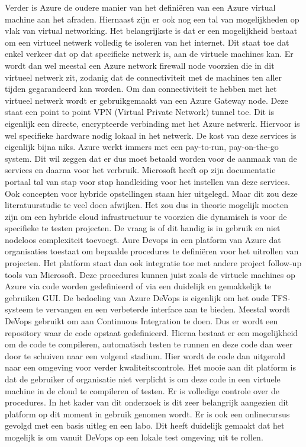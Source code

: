 Verder is Azure de oudere manier van het definiëren van een Azure virtual machine aan het afraden. Hiernaast zijn er ook nog een tal van mogelijkheden op vlak van virtual networking. Het belangrijkste is dat er een mogelijkheid bestaat om een virtueel netwerk volledig te isoleren van het internet. Dit staat toe dat enkel verkeer dat op dat specifieke netwerk is, aan de virtuele machines kan. Er wordt dan wel meestal een Azure network firewall node voorzien die in dit virtueel netwerk zit, zodanig dat de connectiviteit met de machines ten aller tijden gegarandeerd kan worden. Om dan connectiviteit te hebben met het virtueel netwerk wordt er gebruikgemaakt van een Azure Gateway node. Deze staat een point to point VPN (Virtual Private Network) tunnel toe. Dit is eigenlijk een directe, encrypteerde verbinding met het Azure netwerk. Hiervoor is wel specifieke hardware nodig lokaal in het netwerk. De kost van deze services is eigenlijk bijna niks. Azure werkt immers met een pay-to-run, pay-on-the-go system. Dit wil zeggen dat er dus moet betaald worden voor de aanmaak van de services en daarna voor het verbruik. Microsoft heeft op zijn documentatie portaal tal van stap voor stap handleiding voor het instellen van deze services. Ook concepten voor hybride opstellingen staan hier uitgelegd. Maar dit zou deze literatuurstudie te veel doen afwijken.
\newline
\newline
Het zou dus in theorie mogelijk moeten zijn om een hybride cloud infrastructuur te voorzien die dynamisch is voor de specifieke te testen projecten. De vraag is of dit handig is in gebruik en niet nodeloos complexiteit toevoegt.
\newline
\newline
Aure Devops in een platform van Azure dat organisaties toestaat om bepaalde procedures te definiëren voor het uitrollen van projecten. Het platform staat dan ook integratie toe met andere project follow-up tools van Microsoft. Deze procedures kunnen juist zoals de virtuele machines op Azure via code worden gedefinieerd of via een duidelijk en gemakkelijk te gebruiken GUI. De bedoeling van Azure DeVops is eigenlijk om het oude TFS-systeem te vervangen en een verbeterde interface aan te bieden. Meestal wordt DeVops gebruikt om aan Continuous Integration te doen. Dus er wordt een repository waar de code opstaat gedefinieerd. Hierna bestaat er een mogelijkheid om de code te compileren, automatisch testen te runnen en deze code dan weer door te schuiven naar een volgend stadium. Hier wordt de code dan uitgerold naar een omgeving voor verder kwaliteitscontrole. Het mooie aan dit platform is dat de gebruiker of organisatie niet verplicht is om deze code in een virtuele machine in de cloud te compileren of testen. Er is volledige controle over de procedures.
\newline
\newline
In het kader van dit onderzoek is dit zeer belangrijk aangezien dit platform op dit moment in gebruik genomen wordt. Er is ook een onlinecursus gevolgd met een basis uitleg en een labo. Dit heeft duidelijk gemaakt dat het mogelijk is om vanuit DeVops op een lokale test omgeving uit te rollen.
\newline
\newline